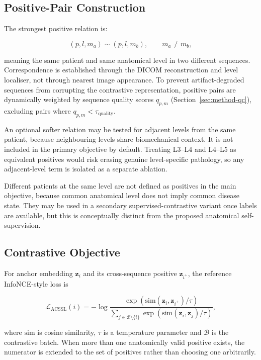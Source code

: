 \subsection{Positive-Pair Construction}
\label{sec:method-positive-pairs}

The strongest positive relation is:

\[
(p,l,m_a)\sim(p,l,m_b),
\qquad m_a\neq m_b,
\]

meaning the same patient and same anatomical level in two different sequences.
Correspondence is established through the DICOM reconstruction and level
localiser, not through nearest image appearance. To prevent artifact-degraded
sequences from corrupting the contrastive representation, positive pairs are
dynamically weighted by sequence quality scores $q_{p,m}$ (Section~\ref{sec:method-qc}),
excluding pairs where $q_{p,m} < \tau_{\mathrm{quality}}$.

An optional softer relation may be tested for adjacent levels from the same
patient, because neighbouring levels share biomechanical context. It is not
included in the primary objective by default. Treating L3--L4 and L4--L5 as
equivalent positives would risk erasing genuine level-specific pathology, so
any adjacent-level term is isolated as a separate ablation.

Different patients at the same level are not defined as positives in the main
objective, because common anatomical level does not imply common disease state.
They may be used in a secondary supervised-contrastive variant once labels are
available, but this is conceptually distinct from the proposed anatomical
self-supervision.

\subsection{Contrastive Objective}
\label{sec:method-ssl-objective}

For anchor embedding $\mathbf{z}_i$ and its cross-sequence positive
$\mathbf{z}_{i^+}$, the reference InfoNCE-style loss is

\begin{equation}
\mathcal{L}_{\mathrm{ACSSL}}(i)
=
-\log
\frac{
\exp(\mathrm{sim}(\mathbf{z}_i,\mathbf{z}_{i^+})/\tau)
}{
\sum_{j\in\mathcal{B}\setminus\{i\}}
\exp(\mathrm{sim}(\mathbf{z}_i,\mathbf{z}_j)/\tau)
},
\label{eq:acssl}
\end{equation}

where $\mathrm{sim}$ is cosine similarity, $\tau$ is a temperature parameter
and $\mathcal{B}$ is the contrastive batch. When more than one anatomically
valid positive exists, the numerator is extended to the set of positives rather
than choosing one arbitrarily.

